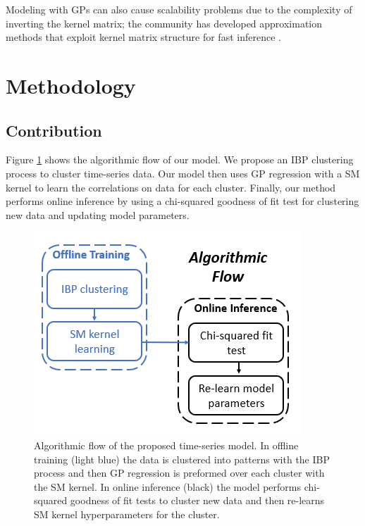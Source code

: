 \documentclass{article}
\begin{document}
Modeling with GPs can also cause scalability problems due to the complexity of inverting the kernel matrix; the community has developed approximation methods that exploit kernel matrix structure for fast inference \cite{KISS-GP}.

\section{Methodology}

\subsection{Contribution}
Figure \ref{AlgFlow} shows the algorithmic flow of our model. We propose an IBP clustering process to cluster time-series data. Our model then uses GP regression with a SM kernel to learn the correlations on data for each cluster. Finally, our method performs online inference by using a chi-squared goodness of fit test for clustering new data and updating model parameters.

\begin{figure}[ht]
\vskip 0.2in
\begin{center}
\centerline{\includegraphics[width=\columnwidth]{AlgFlow}}
\caption{Algorithmic flow of the proposed time-series model. In offline training (light blue) the data is clustered into patterns with the IBP process and then GP regression is preformed over each cluster with the SM kernel. In online inference (black) the model performs chi-squared goodness of fit tests to cluster new data and then re-learns SM kernel hyperparameters for the cluster.}
\label{AlgFlow}
\end{center}
\vskip -0.2in
\end{figure} 
\end{document}
